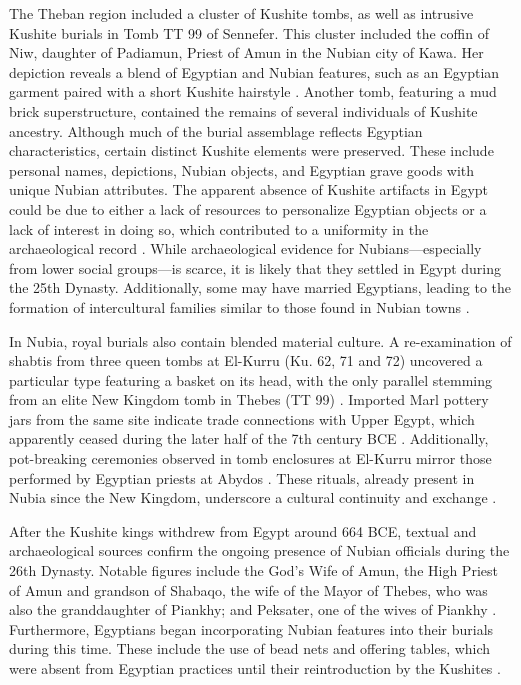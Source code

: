 The Theban region included a cluster of Kushite tombs, as well as intrusive Kushite burials in Tomb TT 99 of Sennefer. This cluster included the coffin of Niw, daughter of Padiamun, Priest of Amun in the Nubian city of Kawa. Her depiction reveals a blend of Egyptian and Nubian features, such as an Egyptian garment paired with a short Kushite hairstyle \parencite[p.~504-505]{budkaKushiteTombGroups2010}. Another tomb, featuring a mud brick superstructure, contained the remains of several individuals of Kushite ancestry. Although much of the burial assemblage reflects Egyptian characteristics, certain distinct Kushite elements were preserved. These include personal names, depictions, Nubian objects, and Egyptian grave goods with unique Nubian attributes. The apparent absence of Kushite artifacts in Egypt could be due to either a lack of resources to personalize Egyptian objects or a lack of interest in doing so, which contributed to a uniformity in the archaeological record \parencite[p.~494]{howleyKushitesEgypt6642020}. While archaeological evidence for Nubians---especially from lower social groups---is scarce, it is likely that they settled in Egypt during the 25th Dynasty. Additionally, some may have married Egyptians, leading to the formation of intercultural families similar to those found in Nubian towns \parencite[p.~477]{budkaNubiansEgypt25th2020}.


In Nubia, royal burials also contain blended material culture. A re-examination of shabtis from three queen tombs at El-Kurru (Ku. 62, 71 and 72) uncovered a particular type featuring a basket on its head, with the only parallel stemming from an elite New Kingdom tomb in Thebes (TT 99) \parencite{mussoKushiteShabtisBasket2011}. Imported Marl pottery jars from the same site indicate trade connections with Upper Egypt, which apparently ceased during the later half of the 7th century BCE \parencite{heidornBostonMuseumFine2018}. Additionally, pot-breaking ceremonies observed in tomb enclosures at El-Kurru mirror those performed by Egyptian priests at Abydos \parencite{budkaEgyptianImpactPotBreaking2014}. These rituals, already present in Nubia since the New Kingdom, underscore a cultural continuity and exchange \parencites[p.~154, 165-166]{smithWretchedKushEthnic2003}[p.~120]{gasperiniAmaraWestCemeteries2023}.


After the Kushite kings withdrew from Egypt around 664 BCE, textual and archaeological sources confirm the ongoing presence of Nubian officials during the 26th Dynasty. Notable figures include the God's Wife of Amun, the High Priest of Amun and grandson of Shabaqo, the wife of the Mayor of Thebes, who was also the granddaughter of Piankhy; and Peksater, one of the wives of Piankhy \parencites{ayadGenderRitualManipulation2016}{beckerFemaleInfluenceAside2016}{lohwasserNubianessGodsWives2016}. Furthermore, Egyptians began incorporating Nubian features into their burials during this time. These include the use of bead nets and offering tables, which were absent from Egyptian practices until their reintroduction by the Kushites \parencites[p.~514]{budkaKushiteTombGroups2010}[p.~494-498]{howleyKushitesEgypt6642020}.


